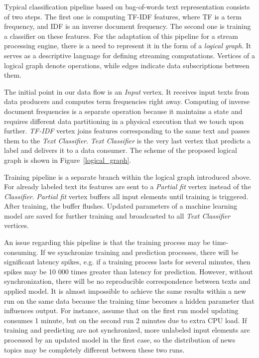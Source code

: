 Typical classification pipeline based on bag-of-words text representation consists of two steps. The first one is computing TF-IDF features, where TF is a term frequency, and IDF is an inverse document frequency. The second one is training a classifier on these features. For the adaptation of this pipeline for a stream processing engine, there is a need to represent it in the form of a {\em logical graph}. It serves as a descriptive language for defining streaming computations. Vertices of a logical graph denote operations, while edges indicate data subscriptions between them. 

The initial point in our data flow is an {\em Input} vertex. It receives input texts from data producers and computes term frequencies right away. Computing of inverse document frequencies is a separate operation because it maintains a state and requires different data partitioning in a physical execution that we touch upon further. {\em TF-IDF} vertex joins features corresponding to the same text and passes them to the {\em Text Classifier}. {\em Text Classifier} is the very last vertex that predicts a label and delivers it to a data consumer. The scheme of the proposed logical graph is shown in Figure~\ref{logical_graph}.

Training pipeline is a separate branch within the logical graph introduced above. For already labeled text its features are sent to a {\em Partial fit} vertex instead of the {\em Classifier}. {\em Partial fit} vertex buffers all input elements until training is triggered. After training, the buffer flushes. Updated parameters of a machine learning model are saved for further training and broadcasted to all {\em Text Classifier} vertices.

An issue regarding this pipeline is that the training process may be time-consuming. If we synchronize training and prediction processes, there will be significant latency spikes, e.g. if a training process lasts for several minutes, then spikes may be 10 000 times greater than latency for prediction. However, without synchronization, there will be no reproducible correspondence between texts and applied model. It is almost impossible to achieve the same results within a new run on the same data because the training time becomes a hidden parameter that influences output. For instance, assume that on the first run model updating consumes 1 minute, but on the second run 2 minutes due to extra CPU load. If training and predicting are not synchronized, more unlabeled input elements are processed by an updated model in the first case, so the distribution of news topics may be completely different between these two runs. 

